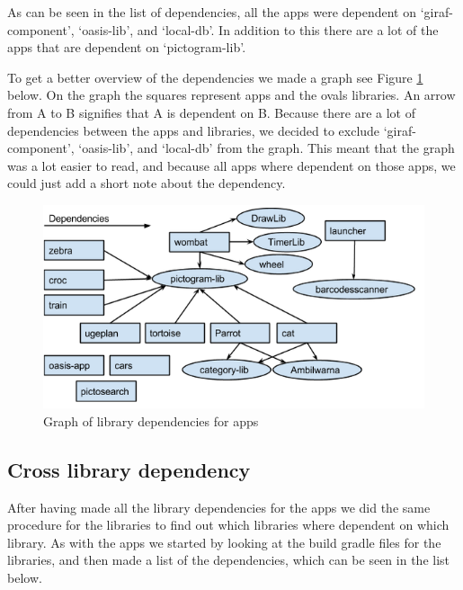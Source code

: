 As can be seen in the list of dependencies, all the apps were dependent on ‘giraf-component’, ‘oasis-lib’, and ‘local-db’. In addition to this there are a lot of the apps that are dependent on ‘pictogram-lib’. 

To get a better overview of the dependencies we made a graph see Figure \ref{AppLibependencies} below. On the graph the squares represent apps and the ovals libraries. An arrow from A to B signifies that A is dependent on B. Because there are a lot of dependencies between the apps and libraries, we decided to exclude ‘giraf-component’, ‘oasis-lib’, and ‘local-db’ from the graph. This meant that the graph was a lot easier to read, and because all apps where dependent on those apps, we could just add a short note about the dependency.


\begin{figure}[H]
	\centering
	\includegraphics[width=0.8 \textwidth]{pictures/AppLibependencies.png}
	\caption{Graph of library dependencies for apps}
	\label{AppLibependencies}
\end{figure}


\subsection{Cross library dependency}
After having made all the library dependencies for the apps we did the same procedure for the libraries to find out which libraries where dependent on which library. As with the apps we started by looking at the build gradle files for the libraries, and then made a list of the dependencies, which can be seen in the list below.

